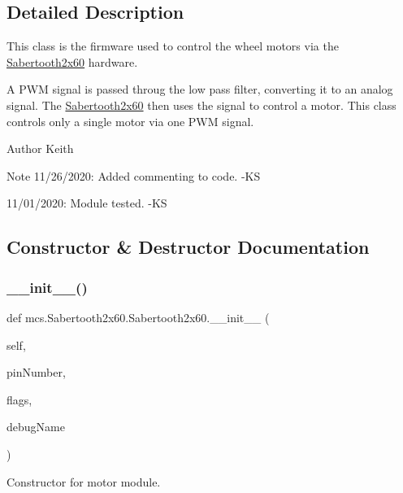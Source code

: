 \subsection{Detailed Description}
This class is the firmware used to control the wheel motors via the \hyperlink{classmcs_1_1Sabertooth2x60_1_1Sabertooth2x60}{Sabertooth2x60} hardware. 

A P\+WM signal is passed throug the low pass filter, converting it to an analog signal. The \hyperlink{classmcs_1_1Sabertooth2x60_1_1Sabertooth2x60}{Sabertooth2x60} then uses the signal to control a motor. This class controls only a single motor via one P\+WM signal. \begin{DoxyAuthor}{Author}
Keith 
\end{DoxyAuthor}
\begin{DoxyNote}{Note}
11/26/2020\+: Added commenting to code. -\/\+KS 

11/01/2020\+: Module tested. -\/\+KS 
\end{DoxyNote}


\subsection{Constructor \& Destructor Documentation}
\mbox{\label{classmcs_1_1Sabertooth2x60_1_1Sabertooth2x60_a9597dc61239ea8dd6285999f7c3b8d2a}} 
\subsubsection{\texorpdfstring{\+\_\+\+\_\+init\+\_\+\+\_\+()}{\_\_init\_\_()}}
{\footnotesize\ttfamily def mcs.\+Sabertooth2x60.\+Sabertooth2x60.\+\_\+\+\_\+init\+\_\+\+\_\+ (\begin{DoxyParamCaption}\item[{}]{self,  }\item[{}]{pin\+Number,  }\item[{}]{flags,  }\item[{}]{debug\+Name }\end{DoxyParamCaption})}



Constructor for motor module. 

